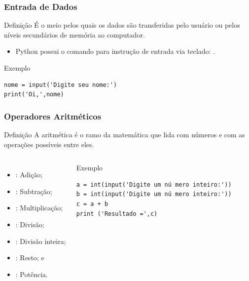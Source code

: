 \documentclass[aspectratio=169]{beamer} %
\begin{document}
\begin{frame}[fragile]
\frametitle{Entrada de Dados}

\begin{block}{Definição}
É o meio pelos quais os dados são transferidas pelo usuário ou pelos níveis secundários de memória ao computador.
\end{block}\vfill

\begin{itemize}
	\item Python possui o comando para instrução de entrada via teclado: .
\end{itemize}\vfill

\begin{exampleblock}{Exemplo}
	\begin{lstlisting}
nome = input('Digite seu nome:')
print('Oi,',nome)
	\end{lstlisting}
\end{exampleblock}
\end{frame}

\begin{frame}[fragile]
\frametitle{Operadores Aritméticos}

\begin{block}{Definição}
A aritmética é o ramo da matemática que lida com números e com as operações possíveis entre eles.
\end{block} \vfill

 \begin{columns}[c]


\begin{itemize}
	\item \structure{+} : Adição;
	\item \structure{-} : Subtração;
	\item \structure{*} : Multiplicação;
	\item \structure{/}  : Divisão;
	\item \structure{//}  : Divisão inteira;
	\item \structure{\%} : Resto; e
	\item \structure{**} : Potência.
\end{itemize}\vfill

\begin{exampleblock}{Exemplo}
	\begin{lstlisting}
a = int(input('Digite um nú mero inteiro:'))
b = int(input('Digite um nú mero inteiro:'))
c = a + b
print ('Resultado =',c)
	\end{lstlisting}
\end{exampleblock}
\end{columns}
\end{frame}
\end{document}
